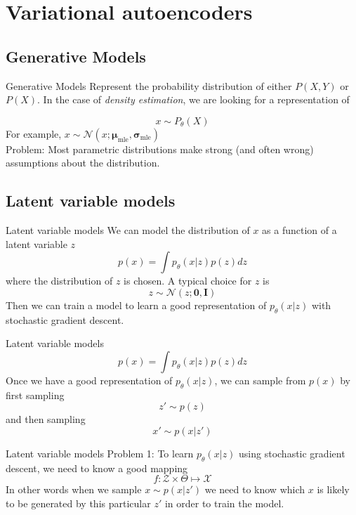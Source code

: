 \documentclass{beamer}
\begin{document}
\section{Variational autoencoders}

\subsection{Generative Models}

\begin{frame}{Generative Models}
Represent the probability distribution of either $P(X,Y)$ or $P(X)$. In the case of \textit{density estimation}, we are looking for a representation of

\huge
\[
	x \sim P_\theta(X)
\]
\normalsize
For example, $x\sim \mathcal{N}(x;\bm{\mu}_{\text{mle}}, \bm{\sigma}_{\text{mle}})$ \\

Problem: Most parametric distributions make strong (and often wrong) assumptions about the distribution.
\end{frame}

\subsection{Latent variable models}

\begin{frame}{Latent variable models}
	We can model the distribution of $x$ as a function of a latent variable $z$
	\[
	p(x) = \int p_\theta (x|z) p(z) dz
	\]
	where the distribution of $z$ is chosen. A typical choice for $z$ is 
	\[
		z\sim \mathcal{N}(z;\bm{0}, \bm{I})
	\]
	Then we can train a model to learn a good representation of $p_\theta (x|z)$ with stochastic gradient descent.
\end{frame}

\begin{frame}{Latent variable models}
	\[
		p(x) = \int p_\theta (x|z) p(z) dz
	\]
	Once we have a good representation of $p_\theta (x|z)$, we can sample from $p(x)$ by first sampling
	\[
		z'\sim p(z)
	\]
	and then sampling\\
	\[
		x'\sim p(x|z')
	\]
\end{frame}

\begin{frame}{Latent variable models}
	Problem 1: To learn $p_\theta(x|z)$ using stochastic gradient descent, we need to know a good mapping 
	\[
		f: \mathcal{Z}\times \Theta \mapsto \mathcal{X}
	\]
	In other words when we sample $x\sim p(x|z')$ we need to know which $x$ is likely to be generated by this particular $z'$ in order to train the model.
\end{frame}
\end{document}

